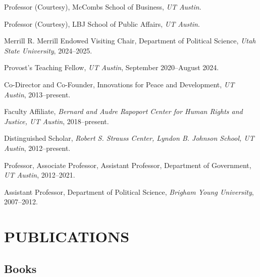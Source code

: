 \documentclass[10pt]{article}
\begin{document}
\noindent Professor (Courtesy), McCombs School of Business, \textit{UT Austin}.

\noindent Professor (Courtesy), LBJ School of Public Affairs, \textit{UT Austin}.

\noindent Merrill R. Merrill Endowed Visiting Chair, Department of Political Science, \textit{Utah State University}, 2024--2025. 

\noindent Provost's Teaching Fellow, \textit{UT  Austin}, September 2020--August 2024.

\noindent Co-Director and Co-Founder, Innovations for Peace and Development, \textit{UT Austin}, 2013--present.

\noindent Faculty Affiliate, \textit{Bernard and Audre Rapoport Center for Human Rights and Justice, UT Austin}, 2018--present.

\noindent Distinguished Scholar, \textit{Robert S. Strauss Center, Lyndon B. Johnson School, UT Austin}, 2012--present.

\noindent Professor, Associate Professor, Assistant Professor, Department of Government, \textit{UT Austin}, 2012--2021.





\noindent Assistant Professor, Department of Political Science, \textit{Brigham Young University}, 2007--2012.





\section*{PUBLICATIONS}


\noindent \subsection*{Books}
\end{document}
